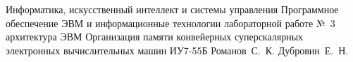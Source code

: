\documentclass{bmstu}
\begin{document}
\makereporttitle
{Информатика, искусственный интеллект и системы управления} %
{Программное обеспечение ЭВМ и информационные технологии} %
{лабораторной работе №~3} %
{архитектура ЭВМ} %
{Организация памяти конвейерных суперскалярных электронных вычислительных машин} %
{} %
{ИУ7-55Б} %
{Романов~С.~К.} %
{Дубровин~Е.~Н.} %


%


%
\end{document}
